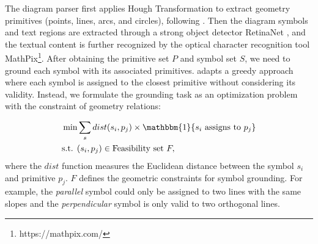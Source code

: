 \documentclass[11pt,a4paper]{article}
\begin{document}
The diagram parser first applies Hough Transformation \citep{shapiro2001computer} to extract geometry primitives (points, lines, arcs, and circles), following \citep{seo2015solving}. Then the diagram symbols and text regions are extracted through a strong object detector RetinaNet \cite{lin2017focal}, and the textual content is further recognized by the optical character recognition tool MathPix\footnote{https://mathpix.com/}.  After obtaining the primitive set $P$ and symbol set $S$, we need to ground each symbol with its associated primitives. \cite{seo2015solving} adapts a greedy approach where each symbol is assigned to the closest primitive without considering its validity. Instead, we formulate the grounding task as an optimization problem with the constraint of geometry relations:

\begin{equation}
\begin{aligned}
    & \min \sum_{s} dist(s_i, p_j) \times \mathbbm{1}\{ s_i \text{ assigns to } p_j \} \\
    & \text{s.t. } (s_i, p_j) \in \text{Feasibility set} ~ F,
\end{aligned} 
\end{equation}
where the $dist$ function measures the Euclidean distance between the symbol $s_i$ and primitive $p_j$. $F$ defines the geometric constraints for symbol grounding. For example, the \textit{parallel} symbol could only be assigned to two lines with the same slopes and the \textit{perpendicular} symbol is only valid to two orthogonal lines.
\end{document}
